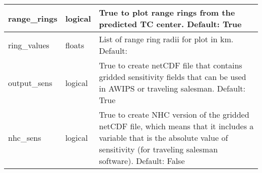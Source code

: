 \documentclass[psfig,12pt]{article}
\begin{document}
\begin{table}[H]
\begin{center}
\begin{tabular}{|p{1.25in}|p{0.5in}|p{4.5in}|}
range\_rings & logical & True to plot range rings from the predicted TC center.  Default: True \\ \hline
ring\_values & floats & List of range ring radii for plot in km.  Default:  \\ \hline
output\_sens & logical & True to create netCDF file that contains gridded sensitivity 
fields that can be used in AWIPS or traveling salesman.  Default:  True \\ \hline
nhc\_sens & logical & True to create NHC version of the gridded netCDF file, which means that
it includes a variable that is the absolute value of sensitivity (for traveling salesman software).
Default:  False \\ \hline
\end{tabular}
\end{center}
\end{table}
\end{document}
